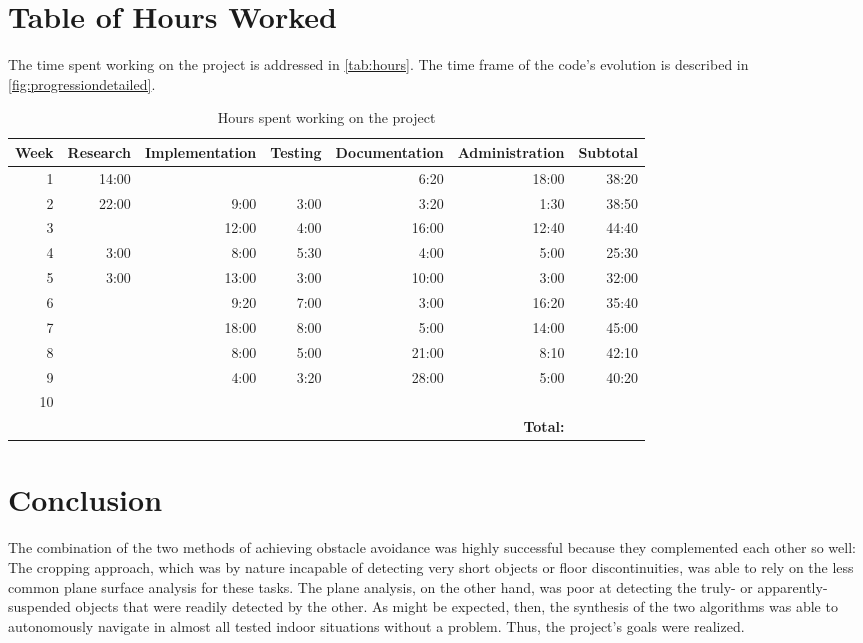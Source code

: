 \documentclass[12pt]{report}
\begin{document}
\section{Table of Hours Worked}
The time spent working on the project is addressed in \autoref{tab:hours}.  The time frame of the code's evolution is described in \autoref{fig:progressiondetailed}.
\begin{table}[h]
\caption[Hours worked]{Hours spent working on the project}
\label{tab:hours}
\begin{tabular}{| r | r | r | r | r | r | r |}
\hline
\scriptsize\textbf{Week} & \scriptsize\textbf{Research} & \scriptsize\textbf{Implementation} & \scriptsize\textbf{Testing} & \scriptsize\textbf{Documentation} & \scriptsize\textbf{Administration} & \scriptsize\textbf{Subtotal} \\
\hline\hline
1 & 14:00 &  &  & 6:20 & 18:00 & 38:20 \\
\hline
2 & 22:00 & 9:00 & 3:00 & 3:20 & 1:30 & 38:50 \\
\hline
3 &  & 12:00 & 4:00 & 16:00 & 12:40 & 44:40 \\
\hline
4 & 3:00 & 8:00 & 5:30 & 4:00 & 5:00 & 25:30 \\
\hline
5 & 3:00 & 13:00 & 3:00 & 10:00 & 3:00 & 32:00 \\
\hline
6 &  & 9:20 & 7:00 & 3:00 & 16:20 & 35:40 \\
\hline
7 &  & 18:00 & 8:00 & 5:00 & 14:00 & 45:00 \\
\hline
8 &  & 8:00 & 5:00 & 21:00 & 8:10 & 42:10 \\
\hline
9 &  & 4:00 & 3:20 & 28:00 & 5:00 & 40:20 \\
\hline
10 &  &  &  &  &  & \\
\hline\hline
&&&&& \scriptsize\textbf{Total:} & \\
\hline
\end{tabular}
\end{table}

\section{Conclusion}
The combination of the two methods of achieving obstacle avoidance was highly successful because they complemented each other so well:  The cropping approach, which was by nature incapable of detecting very short objects or floor discontinuities, was able to rely on the less common plane surface analysis for these tasks.  The plane analysis, on the other hand, was poor at detecting the truly- or apparently-suspended objects that were readily detected by the other.  As might be expected, then, the synthesis of the two algorithms was able to autonomously navigate in almost all tested indoor situations without a problem.  Thus, the project's goals were realized.
\end{document}
